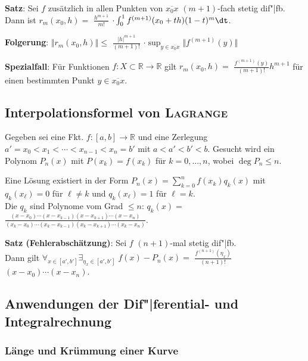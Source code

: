 \textbf{Satz}: Sei $f$ zusätzlich in allen Punkten von $\overline{x_0 x}$
$(m+1)$-fach stetig dif"|fb. \\
Dann ist $r_m(x_0, h) =$ {\large $\frac{h^{m+1}}{m!}$} $\cdot
\int_0^1 f^{(m+1)}(x_0 + th) (1 - t)^m \dt$.

\textbf{Folgerung}:
$\Vert r_m(x_0, h) \Vert \le$ {\large $\frac{|h|^{m+1}}{(m + 1)!}$} $\cdot
\sup_{y \in \overline{x_0 x}} \Vert f^{(m+1)}(y) \Vert$

\textbf{Spezialfall}:
Für Funktionen $f: X \subset \mathbb{R} \rightarrow \mathbb{R}$ gilt
$r_m(x_0, h) =$ {\large $\frac{f^{(m+1)}(y)}{(m + 1)!}$}$h^{m+1}$
für einen bestimmten Punkt $y \in \overline{x_0 x}$.

\pagebreak

\subsection{%
    Interpolationsformel von \textsc{Lagrange}%
}

Gegeben sei eine Fkt. $f: [a,b] \rightarrow \mathbb{R}$ und eine Zerlegung
$a' = x_0 < x_1 < \cdots < x_{n-1} < x_n = b'$ mit $a < a' < b' < b$.
Gesucht wird ein Polynom $P_n(x)$ mit $P(x_k) = f(x_k)$ für $k = 0, \ldots, n$,
wobei $\deg P_n \le n$.

Eine Lösung existiert in der Form $P_n(x) = \sum_{k=0}^n f(x_k)q_k(x)$
mit $q_k(x_\ell) = 0$ für $\ell \not= k$ und
$q_k(x_\ell) = 1$ für $\ell = k$. \\
Die $q_k$ sind Polynome vom Grad $\le n$: \quad
$q_k(x) =$
{\large $\frac{(x - x_0) \cdots (x - x_{k-1}) (x - x_{k+1}) \cdots (x - x_n)}
{(x_k - x_0) \cdots (x_k - x_{k-1}) (x_k - x_{k+1}) \cdots (x_k - x_n)}$}.

\textbf{Satz (Fehlerabschätzung)}:
Sei $f$ $(n+1)$-mal stetig dif"|fb. \\
Dann gilt $\forall_{x \in [a',b']} \exists_{\eta_x \in [a',b']}\;
f(x) - P_n(x) =$ {\large $\frac{f^{(n+1)}(\eta_x)}{(n + 1)!}$}
$(x - x_0) \cdots (x - x_n)$.

\subsection{%
    Anwendungen der Dif"|ferential- und Integralrechnung%
}

\subsubsection{%
    Länge und Krümmung einer Kurve%
}

